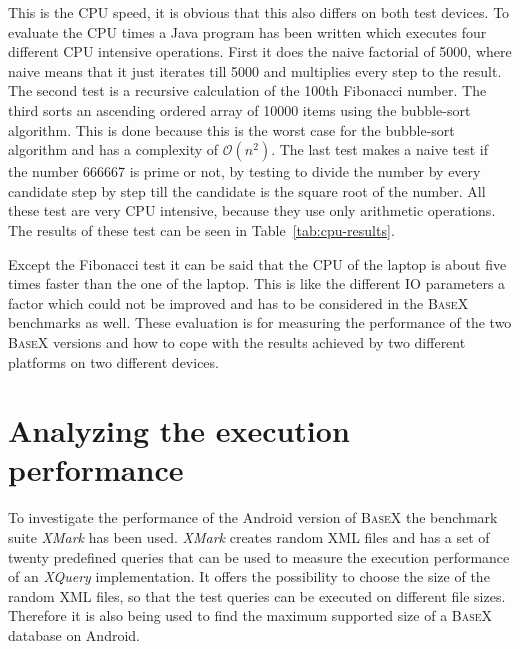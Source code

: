 This is the CPU speed, it is obvious that this also differs on both test devices.
To evaluate the CPU times a Java program has been written which executes four different CPU intensive operations.
First it does the naive factorial of 5000, where naive means that it just iterates till 5000 and multiplies every step to the result.
The second test is a recursive calculation of the 100th Fibonacci number.
The third sorts an ascending ordered array of 10000 items using the bubble-sort algorithm.
This is done because this is the worst case for the bubble-sort algorithm and has a complexity of $\mathcal O(n^2)$.
The last test makes a naive test if the number 666667 is prime or not, by testing to divide the number by every candidate step by step till the candidate is the square root of the number.
All these test are very CPU intensive, because they use only arithmetic operations.
The results of these test can be seen in Table~\ref{tab:cpu-results}.

Except the Fibonacci test it can be said that the CPU of the laptop is about five times faster than the one of the laptop.
This is like the different IO parameters a factor which could not be improved and has to be considered in the \textsc{BaseX} benchmarks as well.
These evaluation is for measuring the performance of the two \textsc{BaseX} versions and how to cope with the results achieved by two different platforms on two different devices.


\section{Analyzing the execution performance}
\label{sec:analysing-the-execution-performance}
To investigate the performance of the Android version of \textsc{BaseX} the benchmark suite \textit{XMark} has been used.
\textit{XMark} creates random XML files and has a set of twenty predefined queries that can be used to measure the execution performance of an \textit{XQuery} implementation.
It offers the possibility to choose the size of the random XML files, so that the test queries can be executed on different file sizes.
Therefore it is also being used to find the maximum supported size of a \textsc{BaseX} database on Android.


